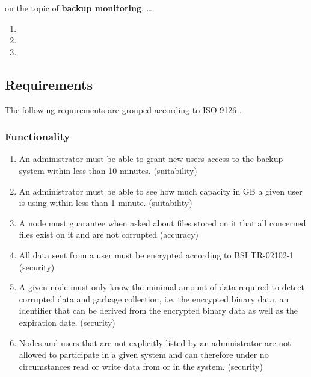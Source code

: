 \begin{flushright}
on the topic of \textbf{backup monitoring}, \ldots{}
\end{flushright}

\begin{enumerate}
	\enumcountrestore
	\item {}
	\item {}
	\item {}
\end{enumerate}


\subsection{Requirements}

The following requirements are grouped according to ISO 9126 \cite{ISO9126}.

\subsubsection{Functionality}

\begin{enumerate}
	\item An administrator must be able to grant new users access to the backup system within less than 10 minutes. (suitability)
	\item An administrator must be able to see how much capacity in GB a given user is using within less than 1 minute. (suitability)
	\item A node must guarantee when asked about files stored on it that all concerned files exist on it and are not corrupted (accuracy)
	\item All data sent from a user must be encrypted according to BSI TR-02102-1 \cite{bsi-tr-02102-1} (security)
	\item A given node must only know the minimal amount of data required to detect corrupted data and garbage collection, i.e. the encrypted binary data, an identifier that can be derived from the encrypted binary data as well as the expiration date. (security)
	\item Nodes and users that are not explicitly listed by an administrator are not allowed to participate in a given system and can therefore under no circumstances read or write data from or in the system. (security)
	\enumcountsave
\end{enumerate}

